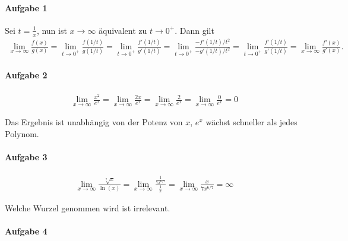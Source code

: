 \documentclass{article}
\begin{document}
\paragraph{Aufgabe 1}

Sei $t = \frac{1}{x}$, nun ist $x \to \infty$ äquivalent zu $t \to 0^+$. Dann gilt
\begin{align*}
    \lim_{x \to \infty} \frac{f(x)}{g(x)} = \lim_{t \to 0^+}\frac{f(1/t)}{g(1/t)} = \lim_{t \to 0^+}\frac{f'(1/t)}{g'(1/t)} = \lim_{t \to 0^+}\frac{-f'(1/t)/t^2}{-g'(1/t)/t^2} = \lim_{t \to 0^+} \frac{f'(1/t)}{g'(1/t)} = \lim_{x \to \infty} \frac{f'(x)}{g'(x)}.
\end{align*}

\paragraph{Aufgabe 2}

\begin{align*}
    \lim_{x \to \infty}\frac{x^2}{e^x} = \lim_{x \to \infty}\frac{2x}{e^x} = \lim_{x \to \infty}\frac{2}{e^x} = \lim_{x \to \infty}\frac{0}{e^x} = 0
\end{align*}

Das Ergebnis ist unabhängig von der Potenz von $x$, $e^x$ wächst schneller als jedes Polynom.

\paragraph{Aufgabe 3}

\begin{align*}
    \lim_{x \to \infty}\frac{\sqrt[7]{x}}{\ln(x)} = \lim_{x \to \infty}\frac{\frac{1}{7x^{6/7}}}{\frac{1}{x}} = \lim_{x \to \infty}\frac{x}{7x^{6/7}} = \infty
\end{align*}

Welche Wurzel genommen wird ist irrelevant.

\paragraph{Aufgabe 4}
\end{document}
